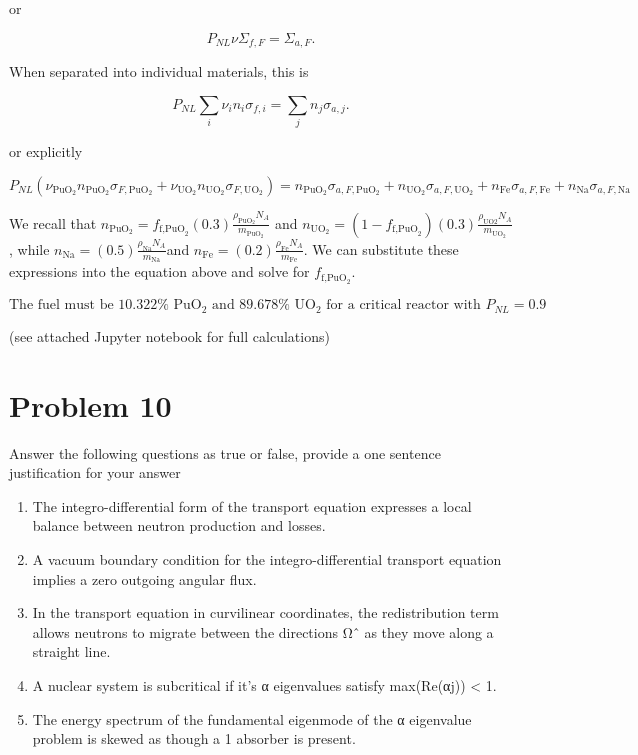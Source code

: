 \documentclass{article}
\begin{document}
or 

$$ P_{NL}\nu \Sigma_{f,F} = \Sigma_{a,F}. $$

When separated into individual materials, this is 

$$ P_{NL}\sum_i \nu_i n_i \sigma_{f,i} = \sum_j n_j \sigma_{a,j} .$$

or explicitly

$$ P_{NL} \left( \nu_{\text{PuO}_2} n_{\text{PuO}_2} \sigma_{F,\text{PuO}_2} + \nu_{\text{UO}_2} n_{\text{UO}_2} \sigma_{F,\text{UO}_2}\right) = n_{\text{PuO}_2} \sigma_{a,F,\text{PuO}_2} + n_{\text{UO}_2} \sigma_{a,F,\text{UO}_2} + n_{\text{Fe}} \sigma_{a,F,\text{Fe}} + n_{\text{Na}} \sigma_{a,F,\text{Na}} $$

We recall that $n_{\text{PuO}_2} = f_{\text{f,PuO}_2}(0.3)\frac{\rho_{\text{PuO}_2} N_A}{m_{\text{PuO}_2}}$ and $n_{\text{UO}_2} = (1-f_{\text{f,PuO}_2})(0.3)\frac{\rho_{\text{UO}2} N_A}{m_{\text{UO}_2}}$, while $n_{\text{Na}} = (0.5)\frac{\rho_{\text{Na}} N_A}{m_{\text{Na}}}$and $n_{\text{Fe}} = (0.2)\frac{\rho_{\text{Fe}} N_A}{m_{\text{Fe}}}$. We can substitute these expressions into the equation above and solve for $f_{\text{f,PuO}_2}$. 

$$\boxed{ \text{The fuel must be } 10.322\% \text{ PuO}_2 \text{ and } 89.678\% \text{ UO}_2 \text{ for a critical reactor with } P_{NL} = 0.9 }$$

(see attached Jupyter notebook for full calculations)



\section*{Problem 10}

Answer the following questions as true or false, provide a one sentence justification for your answer\\
\begin{enumerate}
\item The integro-differential form of the transport equation expresses a local balance between neutron production and losses.
\item A vacuum boundary condition for the integro-differential transport equation implies a zero outgoing angular flux.
\item In the transport equation in curvilinear coordinates, the redistribution term allows neutrons to migrate between the directions Ωˆ as they move along a straight line.
\item A nuclear system is subcritical if it’s α eigenvalues satisfy max(Re(αj)) < 1.
\item The energy spectrum of the fundamental eigenmode of the α eigenvalue problem is skewed as though a 1 absorber is present.
\end{enumerate}
\end{document}
